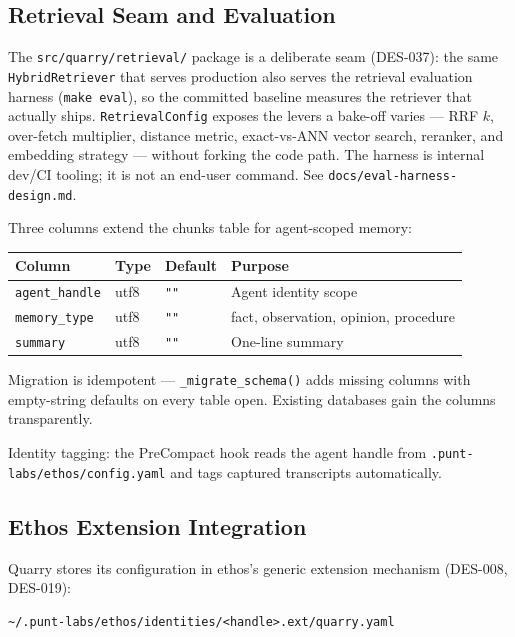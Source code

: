 \documentclass[a4paper,10pt]{article}
\newcommand{\modpath}[1]{\texttt{src/quarry/#1}}
\begin{document}
\subsection{Retrieval Seam and Evaluation}

The \modpath{retrieval/} package is a deliberate seam (DES-037): the same
\texttt{HybridRetriever} that serves production also serves the retrieval
evaluation harness (\texttt{make eval}), so the committed baseline
measures the retriever that actually ships.  \texttt{RetrievalConfig}
exposes the levers a bake-off varies --- RRF $k$, over-fetch multiplier,
distance metric, exact-vs-ANN vector search, reranker, and embedding
strategy --- without forking the code path.  The harness is internal
dev/CI tooling; it is not an end-user command.  See
\texttt{docs/eval-harness-design.md}.

Three columns extend the chunks table for agent-scoped memory:

\begin{center}
\begin{tabular}{llll}
\textbf{Column} & \textbf{Type} & \textbf{Default} & \textbf{Purpose} \\
\hline
\texttt{agent\_handle} & utf8 & \texttt{""} & Agent identity scope \\
\texttt{memory\_type} & utf8 & \texttt{""} & fact, observation, opinion, procedure \\
\texttt{summary} & utf8 & \texttt{""} & One-line summary \\
\end{tabular}
\end{center}

Migration is idempotent --- \texttt{\_migrate\_schema()} adds missing columns
with empty-string defaults on every table open. Existing databases gain
the columns transparently.

Identity tagging: the PreCompact hook reads the agent handle from
\texttt{.punt-labs/ethos/config.yaml} and tags captured transcripts automatically.

\subsection{Ethos Extension Integration}

Quarry stores its configuration in ethos's generic extension mechanism
(DES-008, DES-019):

\begin{verbatim}
~/.punt-labs/ethos/identities/<handle>.ext/quarry.yaml
\end{verbatim}
\end{document}
